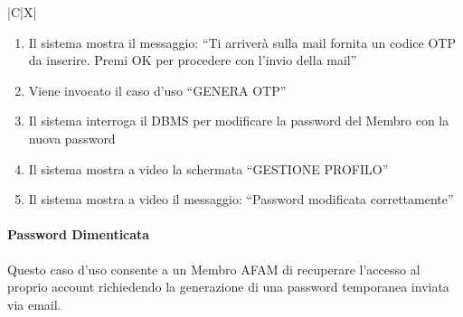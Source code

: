 \begin{tabularx}{\textwidth}{|C|X|}
{\begin{enumerate}
\begin{enumerate}
\begin{enumerate}
            \item Il sistema mostra a video l'errore: ``Errore: I campi ``NUOVA PASSWORD'' e ``CONFERMA NUOVA PASSWORD'' devono essere uguali!''
            \item Il Membro ricompila i campi
            \item Il Membro clicca il pulsante ``CONFERMA''
        \end{enumerate}
        \item Il sistema controlla i valori inseriti
    \end{enumerate}
    \item Il sistema mostra il messaggio: ``Ti arriver\`a sulla mail fornita un codice OTP da inserire. Premi OK per procedere con l'invio della mail''
    \item Viene invocato il caso d'uso ``GENERA OTP''
    \item Il sistema interroga il DBMS per modificare la password del Membro con la nuova password
    \item Il sistema mostra a video la schermata ``GESTIONE PROFILO''
    \item Il sistema mostra a video il messaggio: ``Password modificata correttamente''
\end{enumerate}
}
\hline
\end{tabularx}

\clearpage

\paragraph{Password Dimenticata}
\par{\noindent Questo caso d'uso consente a un Membro AFAM di recuperare l'accesso al proprio account richiedendo la generazione di una password temporanea inviata via email.}

